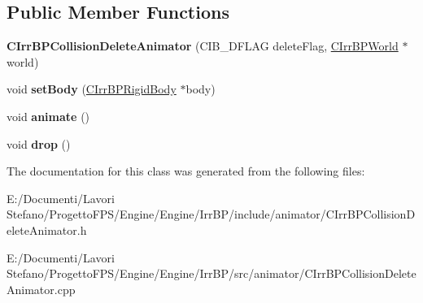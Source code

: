 \subsection*{Public Member Functions}
\begin{DoxyCompactItemize}
\item 
\hypertarget{class_c_irr_b_p_collision_delete_animator_a4f097a814c55b2680acaa341e55aacc5}{
{\bfseries CIrrBPCollisionDeleteAnimator} (CIB\_\-DFLAG deleteFlag, \hyperlink{class_c_irr_b_p_world}{CIrrBPWorld} $\ast$world)}
\label{class_c_irr_b_p_collision_delete_animator_a4f097a814c55b2680acaa341e55aacc5}

\item 
\hypertarget{class_c_irr_b_p_collision_delete_animator_a3f815a8328eff4783d8f8ad985bddbe2}{
void {\bfseries setBody} (\hyperlink{class_c_irr_b_p_rigid_body}{CIrrBPRigidBody} $\ast$body)}
\label{class_c_irr_b_p_collision_delete_animator_a3f815a8328eff4783d8f8ad985bddbe2}

\item 
\hypertarget{class_c_irr_b_p_collision_delete_animator_a45e5e67fe3f214bcd0b12a29c657a2bf}{
void {\bfseries animate} ()}
\label{class_c_irr_b_p_collision_delete_animator_a45e5e67fe3f214bcd0b12a29c657a2bf}

\item 
\hypertarget{class_c_irr_b_p_collision_delete_animator_acbdbc88edb38bf253dcae6588574d95c}{
void {\bfseries drop} ()}
\label{class_c_irr_b_p_collision_delete_animator_acbdbc88edb38bf253dcae6588574d95c}

\end{DoxyCompactItemize}


The documentation for this class was generated from the following files:\begin{DoxyCompactItemize}
\item 
E:/Documenti/Lavori Stefano/ProgettoFPS/Engine/Engine/IrrBP/include/animator/CIrrBPCollisionDeleteAnimator.h\item 
E:/Documenti/Lavori Stefano/ProgettoFPS/Engine/Engine/IrrBP/src/animator/CIrrBPCollisionDeleteAnimator.cpp\end{DoxyCompactItemize}
